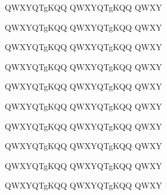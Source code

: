 \documentclass[a2paper]{tubsposter}
\newcommand\fontsizeshow[2]{
  {#1 #2\par}
}
\newcommand\fontshow[1]{%
  \fontsizeshow{\Huge}{#1}%
  \fontsizeshow{\huge}{#1}%
  \fontsizeshow{\LARGE}{#1}%
  \fontsizeshow{\Large}{#1}%
  \fontsizeshow{\large}{#1}%
  \fontsizeshow{\normalsize}{#1}%
  \fontsizeshow{\small}{#1}%
  \fontsizeshow{\footnotesize}{#1}%
  \fontsizeshow{\scriptsize}{#1}%
  \fontsizeshow{\tiny}{#1}%
}
\begin{document}
\fontshow{QWXYQTgKQQ QWXYQTgKQQ QWXY}
\end{document}
